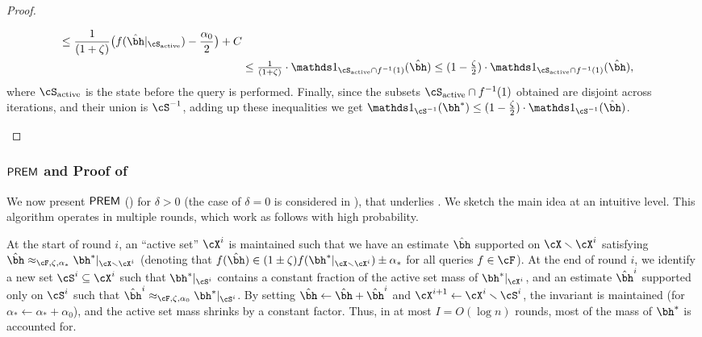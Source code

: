 \begin{proof}
\begin{description}[leftmargin=5pt]
\begin{align*}
            \leq \frac{1}{(1+\zeta)}\big( f(\hbh|_{\Sactive}) - \frac{\alpha_0}{2} \big) + C\\
            &\textstyle\leq \frac{1}{(1+\zeta)} \cdot  \ind_{\Sactive\cap f^{-1}(1)}(\hbh) 
            \leq (1-\frac\zeta2) \cdot \ind_{\Sactive\cap f^{-1}(1)}(\hbh),
        \end{align*}
        where $\Sactive$ is the state before the query is performed.
        Finally, since the subsets $\Sactive\cap f^{-1}(1)$
        obtained are disjoint across iterations, and their union is $\Sminus$, adding up these inequalities we get
        $
            \ind_{\Sminus}(\bh^{\ast})  
            \leq (1-\frac\zeta2) \cdot \ind_{\Sminus}( \hbh)
        $.
    \end{description}
    \vspace{-6mm}
\end{proof}



\subsubsection{$\mathsf{PREM}$ and Proof of }

We now present $\mathsf{PREM}$ () for $\delta>0$ (the case of $\delta=0$ is considered in ), that underlies . We sketch the main idea at an intuitive level.
This algorithm operates in multiple rounds, which work as follows with high probability.

At the start of round $i$, an ``active set'' $\cX^i$ is maintained such that we have an estimate $\hbh$ supported on ${\cX \smallsetminus \cX^i}$ satisfying $\hbh \approx_{\cF,\zeta,\alpha_*} \bh^*|_{\cX \smallsetminus \cX^i}$ (denoting that $f(\hbh) \in (1 \pm \zeta) f(\bh^{\ast}|_{\cX \smallsetminus \cX^i}) \pm \alpha_*$ for all queries $f \in \cF$).
At the end of round $i$, we identify a new set $\cS^i \subseteq \cX^i$ such that $\bh^{\ast}|_{\cS^i}$ contains a constant fraction of the active set mass of $\bh^{\ast}|_{\cX^i}$, and an estimate $\hbh^{i}$ supported only on $\cS^i$ such that $\hbh^{i} \approx_{\cF, \zeta, \alpha_0} \bh^{\ast}|_{\cS^i}$. By setting $\hbh \gets \hbh + \hbh^i$ and $\cX^{i+1} \gets \cX^i \smallsetminus \cS^i$, the invariant is maintained (for $\alpha_* \gets \alpha_* + \alpha_0$), and the active set mass shrinks by a constant factor. Thus, in at most $I = O(\log n)$ rounds, most of the mass of $\bh^*$ is accounted for.

